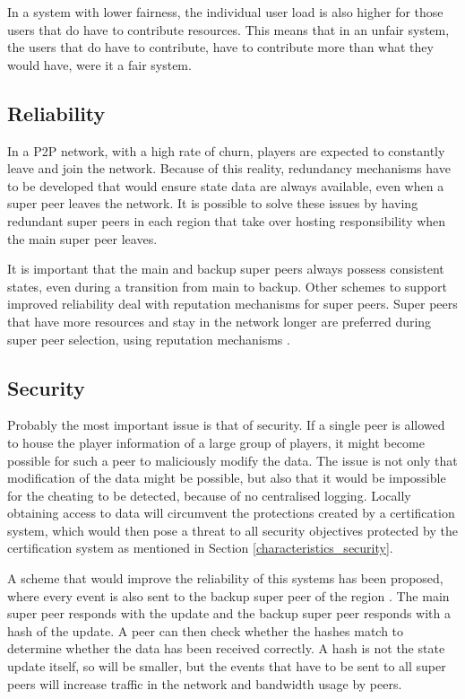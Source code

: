 In a system with lower fairness, the individual user load is also higher for those users that do have to contribute resources. This means that in an
unfair system, the users that do have to contribute, have to contribute more than what they would have, were it a fair system.

\subsection{Reliability}
\label{super_peer_storage_reliability}

In a P2P network, with a high rate of churn, players are expected to constantly leave and join the network. Because of this reality, redundancy mechanisms have to be developed that would ensure state data are always available, even when a super peer leaves the network. It is possible to solve these issues by having redundant super peers in each region that take over hosting responsibility when the main super peer leaves.

It is important that the main and backup super peers always possess consistent states, even during a transition from main to backup. Other schemes to support improved reliability deal with reputation mechanisms for super peers. Super peers that have more resources and stay in the network longer are preferred during super peer selection, using reputation mechanisms \cite{fan_mediator_paper}.

\subsection{Security}

Probably the most important issue is that of security. If a single peer is allowed to house the player information of a large group of players, it
might become possible for such a peer to maliciously modify the data. The issue is not only that modification of the data might be possible, but also
that it would be impossible for the cheating to be detected, because of no centralised logging. Locally obtaining access to data will circumvent the
protections created by a certification system, which would then pose a threat to all security objectives protected by the certification system as
mentioned in Section \ref{characteristics_security}.

A scheme that would improve the reliability of this systems has been proposed, where every event is also sent to the backup super peer of the region
\cite{past_storage_focus}. The main super peer responds with the update and the backup super peer responds with a hash of the update. A peer can then
check whether the hashes match to determine whether the data has been received correctly. A hash is not the state update itself, so will be smaller,
but the events that have to be sent to all super peers will increase traffic in the network and bandwidth usage by peers.

